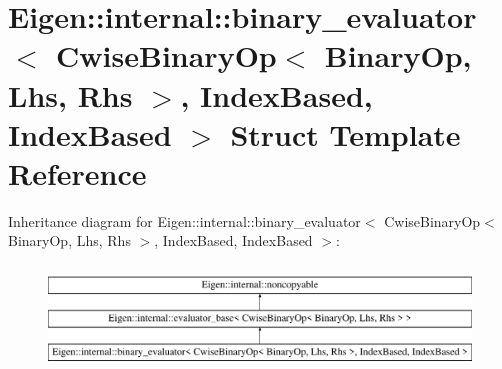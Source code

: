 \hypertarget{struct_eigen_1_1internal_1_1binary__evaluator_3_01_cwise_binary_op_3_01_binary_op_00_01_lhs_00_009c1543c08828196fc8ade7d79a56c66}{}\section{Eigen\+::internal\+::binary\+\_\+evaluator$<$ Cwise\+Binary\+Op$<$ Binary\+Op, Lhs, Rhs $>$, Index\+Based, Index\+Based $>$ Struct Template Reference}
\label{struct_eigen_1_1internal_1_1binary__evaluator_3_01_cwise_binary_op_3_01_binary_op_00_01_lhs_00_009c1543c08828196fc8ade7d79a56c66}
Inheritance diagram for Eigen\+::internal\+::binary\+\_\+evaluator$<$ Cwise\+Binary\+Op$<$ Binary\+Op, Lhs, Rhs $>$, Index\+Based, Index\+Based $>$\+:\begin{figure}[H]
\begin{center}
\leavevmode
\includegraphics[height=2.804674cm]{struct_eigen_1_1internal_1_1binary__evaluator_3_01_cwise_binary_op_3_01_binary_op_00_01_lhs_00_009c1543c08828196fc8ade7d79a56c66}
\end{center}
\end{figure}

